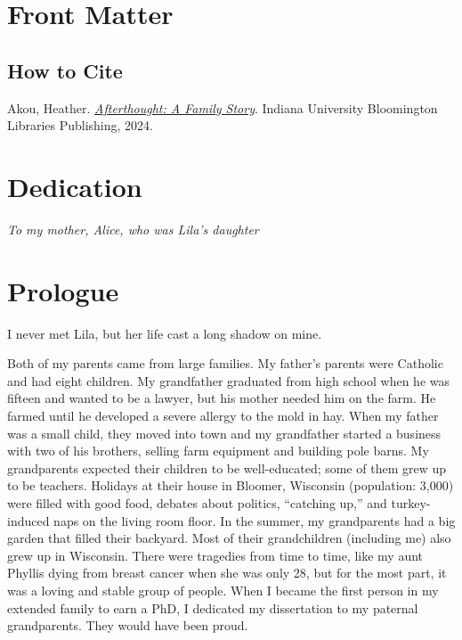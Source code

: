 \documentclass[
  letterpaper,
]{book}
\renewcommand*\contentsname{Table of contents}
\newcommand\contentsname{Table of contents}
\begin{document}

\renewcommand*\contentsname{Table of Contents}
{
\hypersetup{linkcolor=blue}
\setcounter{tocdepth}{2}
\tableofcontents
}
\listoffigures

\mainmatter
{}

\chapter{Front Matter}\label{front-matter}

\section{How to Cite}\label{how-to-cite}

Akou, Heather. \href{https://doi.org/}{\emph{Afterthought: A Family
Story}}. Indiana University Bloomington Libraries Publishing, 2024.


\chapter{Dedication}\label{dedication}

\emph{To my mother, Alice, who was Lila's daughter}


\chapter{Prologue}\label{prologue}

I never met Lila, but her life cast a long shadow on mine.

Both of my parents came from large families. My father's parents were
Catholic and had eight children. My grandfather graduated from high
school when he was fifteen and wanted to be a lawyer, but his mother
needed him on the farm. He farmed until he developed a severe allergy to
the mold in hay. When my father was a small child, they moved into town
and my grandfather started a business with two of his brothers, selling
farm equipment and building pole barns. My grandparents expected their
children to be well-educated; some of them grew up to be teachers.
Holidays at their house in Bloomer, Wisconsin (population: 3,000) were
filled with good food, debates about politics, ``catching up,'' and
turkey-induced naps on the living room floor. In the summer, my
grandparents had a big garden that filled their backyard. Most of their
grandchildren (including me) also grew up in Wisconsin. There were
tragedies from time to time, like my aunt Phyllis dying from breast
cancer when she was only 28, but for the most part, it was a loving and
stable group of people. When I became the first person in my extended
family to earn a PhD, I dedicated my dissertation to my paternal
grandparents. They would have been proud.
\end{document}

